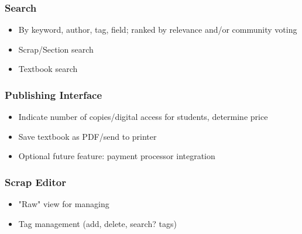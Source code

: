 \documentclass[letterpaper, 10pt, draftclsnofoot, compsoc, onecolumn]{IEEEtran}
\begin{document}
{{\subsubsection[System feature 4: Search Feature]{\rmfamily\bfseries\color{black} Search}
\begin{itemize}
\item By keyword, author, tag, field; ranked by relevance and/or community voting
\item Scrap/Section search
\item Textbook search
\end{itemize}

\subsubsection[System feature 5: Publishing Interface]{\rmfamily\bfseries\color{black} Publishing Interface}
\begin{itemize}
\item Indicate number of copies/digital access for students, determine price
\item Save textbook as PDF/send to printer
\item Optional future feature: payment processor integration
\end{itemize}

\subsubsection[System feature 6: Scrap Editor]{\rmfamily\bfseries\color{black} Scrap Editor}
\begin{itemize}
\item "Raw" view for managing
\item Tag management (add, delete, search? tags)
\end{itemize}

\bigskip


}}
\end{document}
